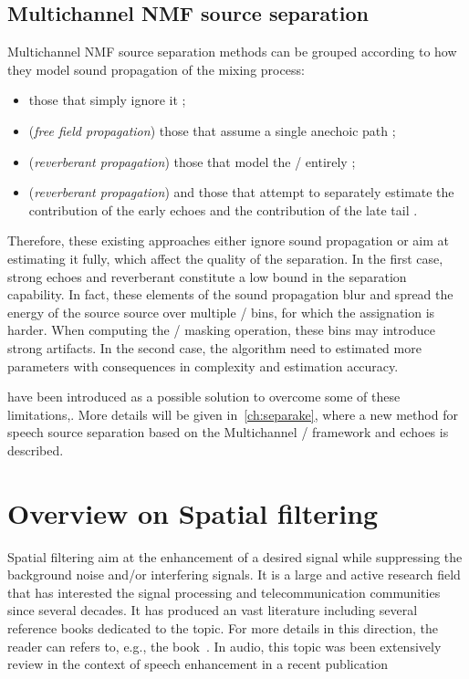 \subsection{Multichannel NMF source separation}
Multichannel NMF source separation methods can be grouped according to how they model sound propagation of the mixing process:
\begin{itemize}
    \item those that simply ignore it ;
    \item (\textit{free field propagation}) those that assume a single anechoic path  ;
    \item (\textit{reverberant propagation}) those that model the \RTFs/ entirely ;
    \item (\textit{reverberant propagation}) and those that attempt to separately estimate the contribution of the early echoes and the contribution of the late tail .
\end{itemize}
Therefore, these existing approaches either ignore sound propagation or aim at estimating it fully, which affect the quality of the separation.
In the first case, strong echoes and reverberant constitute a low bound in the separation capability.
In fact, these elements of the sound propagation blur and spread the energy of the source source over multiple \TF/ bins, for which the assignation is harder.
When computing the \TF/ masking operation, these bins may introduce strong artifacts.
In the second case, the algorithm need to estimated more parameters with consequences in complexity and estimation accuracy.

 have been introduced as a possible solution to overcome some of these limitations,.
More details will be given in~\cref{ch:separake}, where a new method for speech source separation based on the Multichannel \NMF/ framework and echoes is described.

\section{Overview on Spatial filtering}\label{sec:application:filtering}
Spatial filtering aim at the enhancement of a desired signal while suppressing the background noise and/or interfering signals.
It is a large and active research field that has interested the signal processing and telecommunication communities since several decades.
It has produced an vast literature including several reference books dedicated to the topic.
For more details in this direction, the reader can refers to, e.g., the book~.
In audio, this topic was been extensively review in the context of speech enhancement in a recent publication~

